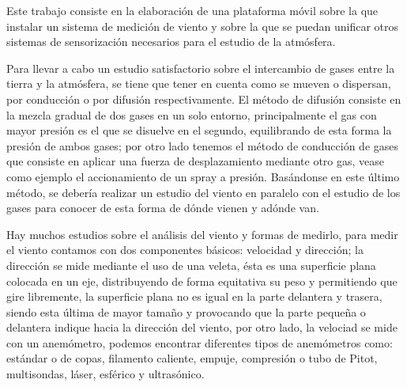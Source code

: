 

Este trabajo consiste en la elaboración de una plataforma móvil sobre la que instalar un sistema de medición de viento y sobre la que se puedan unificar otros sistemas de sensorización necesarios para el estudio de la atmósfera.

Para llevar a cabo un estudio satisfactorio sobre el intercambio de gases entre la tierra y la atmósfera, se tiene que tener en cuenta como se mueven o dispersan, por conducción o por difusión respectivamente. El método de difusión consiste en la mezcla gradual de dos gases en un solo entorno, principalmente el gas con mayor presión es el que se disuelve en el segundo, equilibrando de esta forma la presión de ambos gases; por otro lado tenemos el método de conducción de gases que consiste en aplicar una fuerza de desplazamiento mediante otro gas, vease como ejemplo el accionamiento de un spray a presión. Basándonse en este último método, se debería realizar un estudio del viento en paralelo con el estudio de los gases para conocer de esta forma de dónde vienen y adónde van. 

Hay muchos estudios sobre el análisis del viento y formas de medirlo, para medir el viento contamos con dos componentes básicos: velocidad y dirección; la dirección se mide mediante el uso de una veleta\cite{Noble2019}\cite{Mur2012}, ésta es una superficie plana colocada en un eje, distribuyendo de forma equitativa su peso y permitiendo que gire libremente, la superficie plana no es igual en la parte delantera y trasera, siendo esta última de mayor tamaño y provocando que la parte pequeña o delantera indique hacia la dirección del viento, por otro lado, la velociad se mide con un anemómetro\cite{Mur2012}, podemos encontrar diferentes tipos de anemómetros como: estándar o de copas, filamento caliente, empuje, compresión o tubo de Pitot, multisondas, láser, esférico y ultrasónico.

